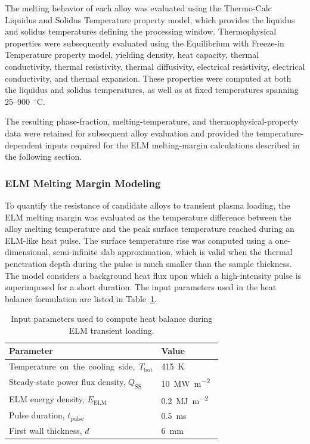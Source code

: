 The melting behavior of each alloy was evaluated using the Thermo-Calc Liquidus and Solidus Temperature property model, which provides the liquidus and solidus temperatures defining the processing window. Thermophysical properties were subsequently evaluated using the Equilibrium with Freeze-in Temperature property model, yielding density, heat capacity, thermal conductivity, thermal resistivity, thermal diffusivity, electrical resistivity, electrical conductivity, and thermal expansion. These properties were computed at both the liquidus and solidus temperatures, as well as at fixed temperatures spanning 25--900~$^{\circ}\mathrm{C}$.

The resulting phase-fraction, melting-temperature, and thermophysical-property data were retained for subsequent alloy evaluation and provided the temperature-dependent inputs required for the ELM melting-margin calculations described in the following section.


\subsubsection{ELM Melting Margin Modeling}
\label{subsec:elm-methods}

To quantify the resistance of candidate alloys to transient plasma loading, the ELM melting margin was evaluated as the temperature difference between the alloy melting temperature and the peak surface temperature reached during an ELM-like heat pulse. The surface temperature rise was computed using a one-dimensional, semi-infinite slab approximation, which is valid when the thermal penetration depth during the pulse is much smaller than the sample thickness. The model considers a background heat flux upon which a high-intensity pulse is superimposed for a short duration. The input parameters used in the heat balance formulation are listed in
Table~\ref{tab:ELM_params}.

\begin{table}[H]
\centering
\caption{Input parameters used to compute heat balance during ELM transient loading.}
\label{tab:ELM_params}
\begin{tabularx}{\columnwidth}{Xl}
\toprule
\textbf{Parameter} & \textbf{Value} \\
\midrule
\mbox{Temperature on the cooling side, $T_{\mathrm{bot}}$} & \SI{415}{\kelvin}~\cite{VandenKerkhof2021,DeTemmerman2018} \\
Steady-state power flux density, $Q_{\mathrm{SS}}$ & \SI{10}{\mega\watt\per\square\meter}~\cite{Pitts2019,VandenKerkhof2021} \\
ELM energy density, $E_{\mathrm{ELM}}$ & \SI{0.2}{\mega\joule\per\square\meter}~\cite{Farid2015} \\
Pulse duration, $t_{\mathrm{pulse}}$ & \SI{0.5}{\milli\second}~\cite{Farid2015,DeTemmerman2018} \\
First wall thickness, $d$ & \SI{6}{\milli\meter}~\cite{VandenKerkhof2021,DeTemmerman2018} \\
\bottomrule
\end{tabularx}
\end{table}


